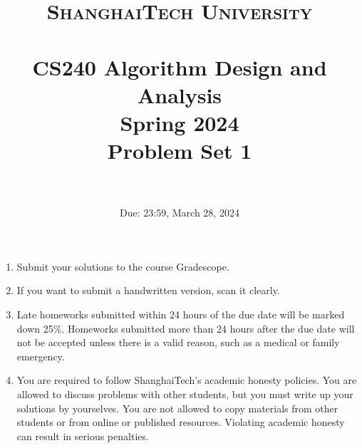 \documentclass{article}
\title{
    \normalfont \normalsize
    \textsc{ShanghaiTech University} \\ [25pt]
    \horrule{0.5pt} \\[0.4cm] %
    \huge CS240 Algorithm Design and Analysis \\ %
    \LARGE Spring 2024\\
    \LARGE Problem Set 1\\
    \horrule{2pt} \\[0.5cm] %
}
\author{}
\date{Due: 23:59, March 28, 2024}
\begin{document}
\maketitle
\vspace{3ex}

\begin{enumerate}
\item Submit your solutions to the course Gradescope.
\item If you want to submit a handwritten version, scan it clearly.
\item Late homeworks submitted within 24 hours of the due date will be marked down 25\%.  Homeworks submitted more than 24 hours after the due date will not be accepted unless there is a valid reason, such as a medical or family emergency.  
\item You are required to follow ShanghaiTech's academic honesty policies.  You are allowed to discuss problems with other students, but you must write up your solutions by yourselves.  You are not allowed to copy materials from other students or from online or published resources.  Violating academic honesty can result in serious penalties.  
\end{enumerate}

\newpage



\end{document}

